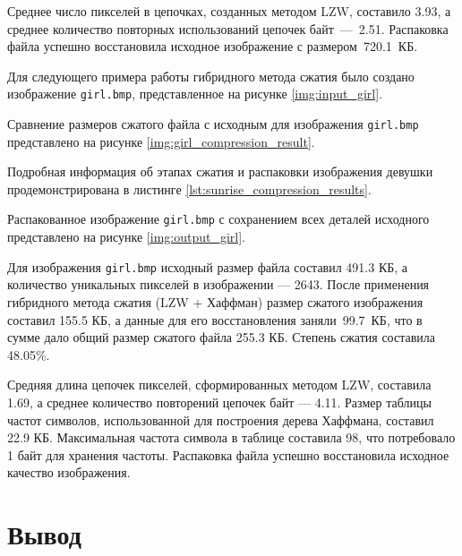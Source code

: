 Среднее число пикселей в цепочках, созданных методом LZW, составило 3.93, а среднее количество повторных использований цепочек байт~---~2.51. Распаковка файла успешно восстановила исходное изображение с размером~720.1~КБ.

\clearpage


Для следующего примера работы гибридного метода сжатия было создано изображение \texttt{girl.bmp}, представленное на рисунке \ref{img:input_girl}.


Сравнение размеров сжатого файла с исходным для изображения \texttt{girl.bmp} представлено на рисунке \ref{img:girl_compression_result}. 


Подробная информация об этапах сжатия и распаковки изображения девушки продемонстрирована в листинге \ref{lst:sunrise_compression_results}.


Распакованное изображение \texttt{girl.bmp} с сохранением всех деталей исходного представлено на рисунке \ref{img:output_girl}.


Для изображения \texttt{girl.bmp} исходный размер файла составил 491.3 КБ, а количество уникальных пикселей в изображении --- 2643. После применения гибридного метода сжатия (LZW + Хаффман) размер сжатого изображения составил 155.5 КБ, а данные для его восстановления заняли~99.7~КБ, что в сумме дало общий размер сжатого файла 255.3 КБ. Степень сжатия составила 48.05\%.

Средняя длина цепочек пикселей, сформированных методом LZW, составила 1.69, а среднее количество повторений цепочек байт --- 4.11. Размер таблицы частот символов, использованной для построения дерева Хаффмана, составил 22.9 КБ. Максимальная частота символа в таблице составила 98, что потребовало 1 байт для хранения частоты. Распаковка файла успешно восстановила исходное качество изображения.

\section*{Вывод}

